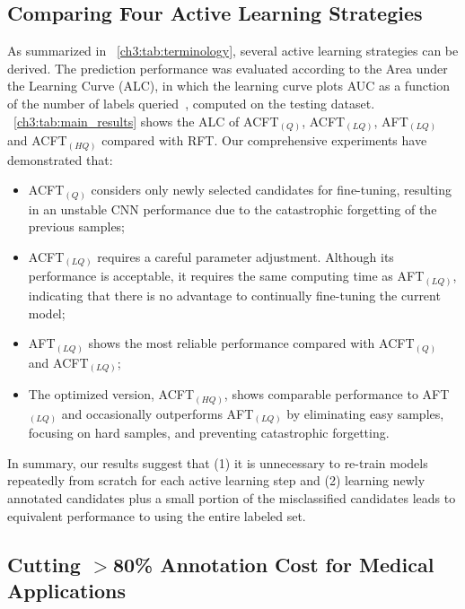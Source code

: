 \subsection{Comparing Four Active Learning Strategies}
\label{ch3:experiment_result:comparing_four_active_learning_strategies}

As summarized in \tableautorefname~\ref{ch3:tab:terminology}, several active learning strategies can be derived. The prediction performance was evaluated according to the Area under the Learning Curve (ALC), in which the learning curve plots AUC as a function of the number of labels queried~\citep{guyon2011results}, computed on the testing dataset. \tableautorefname~\ref{ch3:tab:main_results} shows the ALC of ACFT$_{(Q)}$, ACFT$_{(LQ)}$, AFT$_{(LQ)}$ and ACFT$_{(HQ)}$ compared with RFT. Our comprehensive experiments have demonstrated that:

\begin{itemize}
    \item ACFT$_{(Q)}$ considers only newly selected candidates for fine-tuning, resulting in an unstable CNN performance due to the catastrophic forgetting of the previous samples;
    \item ACFT$_{(LQ)}$ requires a careful parameter adjustment. Although its performance is acceptable, it requires the same computing time as AFT$_{(LQ)}$, indicating that there is no advantage to continually fine-tuning the current model;
    \item AFT$_{(LQ)}$ shows the most reliable performance compared with ACFT$_{(Q)}$ and ACFT$_{(LQ)}$;
    \item The optimized version, ACFT$_{(HQ)}$, shows comparable performance to AFT$_{(LQ)}$ and occasionally outperforms AFT$_{(LQ)}$ by eliminating easy samples, focusing on hard samples, and preventing catastrophic forgetting.
\end{itemize}

In summary, our results suggest that (1) it is unnecessary to re-train models repeatedly from scratch for each active learning step and (2) learning newly annotated candidates plus a small portion of the misclassified candidates leads to equivalent performance to using the entire labeled set.


\subsection{Cutting $>$80\% Annotation Cost for Medical Applications}
\label{ch3:experiment_result:cutting_annotation_cost}


